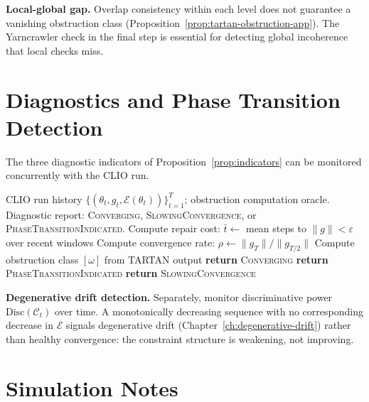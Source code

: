 \documentclass[11pt,openany]{book}
\begin{document}
\textbf{Local-global gap.} Overlap consistency within each
level does not guarantee a vanishing obstruction class
(Proposition~\ref{prop:tartan-obstruction-app}).  The
Yarncrawler check in the final step is essential for
detecting global incoherence that local checks miss.

\section{Diagnostics and Phase Transition Detection}
\label{sec:diagnostics}

The three diagnostic indicators of
Proposition~\ref{prop:indicators} can be monitored
concurrently with the CLIO run.

\begin{algorithm}
\caption{Phase Transition Diagnostics}
\label{alg:diagnostics}
\begin{algorithmic}
\Require CLIO run history $\{(\theta_t, g_t,
  \mathcal{E}(\theta_t))\}_{t=1}^T$;
  obstruction computation oracle.
\Ensure Diagnostic report: \textsc{Converging},
  \textsc{SlowingConvergence}, or
  \textsc{PhaseTransitionIndicated}.
\State Compute repair cost: $\bar{t} \gets$ mean steps
  to $\|g\| < \varepsilon$ over recent windows
\State Compute convergence rate: $\rho \gets
  \|g_{T}\| / \|g_{T/2}\|$
\State Compute obstruction class $[\omega]$ from TARTAN
  output
  \State \textbf{return} \textsc{Converging}
  \State \textbf{return} \textsc{PhaseTransitionIndicated}
\Else
  \State \textbf{return} \textsc{SlowingConvergence}
\EndIf
\end{algorithmic}
\end{algorithm}

\textbf{Degenerative drift detection.}  Separately, monitor
discriminative power $\mathrm{Disc}(\mathcal{C}_t)$ over
time.  A monotonically decreasing sequence with no
corresponding decrease in $\mathcal{E}$ signals degenerative
drift (Chapter~\ref{ch:degenerative-drift}) rather than
healthy convergence: the constraint structure is weakening,
not improving.

\section{Simulation Notes}
\label{sec:simulation-notes}
\end{document}
